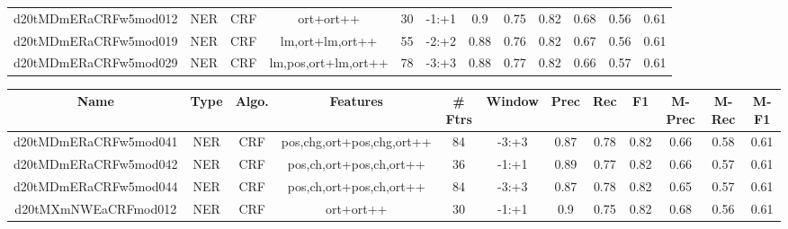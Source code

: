 \documentclass[a4paper]{article}
\begin{document}
\begin{landscape}
\begin{center}
\begin{tabular}{ |c|c|c|c|c|c|c|c|c|c|c|c|}
 
 	
 	\small{ d20tMDmERaCRFw5mod012 } & \small{ NER} & \small{  CRF }  & ort+ort++  &  30 &  \small{  -1:+1 }  &  0.9 & 0.75 & 0.82  &  0.68 & 0.56 & 0.61 \\
 	

 
 	
 	\small{ d20tMDmERaCRFw5mod019 } & \small{ NER} & \small{  CRF }  & lm,ort+lm,ort++  &  55 &  \small{  -2:+2 }  &  0.88 & 0.76 & 0.82  &  0.67 & 0.56 & 0.61 \\
 	

 
 	
 	\small{ d20tMDmERaCRFw5mod029 } & \small{ NER} & \small{  CRF }  & lm,pos,ort+lm,ort++  &  78 &  \small{  -3:+3 }  &  0.88 & 0.77 & 0.82  &  0.66 & 0.57 & 0.61 \\
 	
 \hline
\end{tabular}
\end{center}




\begin{center}
\begin{tabular}{ |c|c|c|c|c|c|c|c|c|c|c|c|} 
 \hline
 	Name & Type & Algo. & Features & \# Ftrs & Window & Prec & Rec & F1 & M-Prec & M-Rec & M-F1\\
 \hline

 	

 
 	
 	\small{ d20tMDmERaCRFw5mod041 } & \small{ NER} & \small{  CRF }  & pos,chg,ort+pos,chg,ort++  &  84 &  \small{  -3:+3 }  &  0.87 & 0.78 & 0.82  &  0.66 & 0.58 & 0.61 \\
 	

 
 	
 	\small{ d20tMDmERaCRFw5mod042 } & \small{ NER} & \small{  CRF }  & pos,ch,ort+pos,ch,ort++  &  36 &  \small{  -1:+1 }  &  0.89 & 0.77 & 0.82  &  0.66 & 0.57 & 0.61 \\
 	

 
 	
 	\small{ d20tMDmERaCRFw5mod044 } & \small{ NER} & \small{  CRF }  & pos,ch,ort+pos,ch,ort++  &  84 &  \small{  -3:+3 }  &  0.87 & 0.78 & 0.82  &  0.65 & 0.57 & 0.61 \\
 	

 
 	
 	\small{ d20tMXmNWEaCRFmod012 } & \small{ NER} & \small{  CRF }  & ort+ort++  &  30 &  \small{  -1:+1 }  &  0.9 & 0.75 & 0.82  &  0.68 & 0.56 & 0.61 \\
 	


\end{tabular}
\end{center}
\end{landscape}
\end{document}
